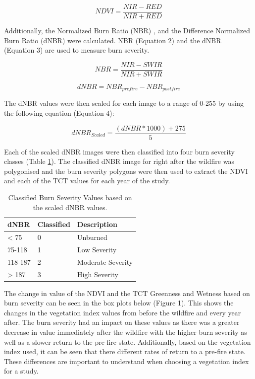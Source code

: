 \documentclass[
]{book}
\begin{document}
\begin{equation}
\tag{1}
  NDVI = \frac{NIR - RED}{NIR + RED}
\end{equation}

Additionally, the Normalized Burn Ratio (NBR) \citep{lopez_garcia_mapping_1991}, and the Difference Normalized Burn Ratio (dNBR) \citep{key_landscape_2006} were calculated. NBR (Equation 2) and the dNBR (Equation 3) are used to measure burn severity.

\begin{equation}
\tag{2}
  NBR = \frac{NIR - SWIR}{NIR + SWIR}
\end{equation}

\begin{equation}
\tag{3}
  dNBR = NBR_{pre fire} - NBR_{post fire}
\end{equation}

The dNBR values were then scaled for each image to a range of 0-255 by using the following equation (Equation 4):

\begin{equation}
\tag{4}
  dNBR_{Scaled} = \frac{(dNBR * 1000) + 275}{5}
\end{equation}

Each of the scaled dNBR images were then classified into four burn severity classes (Table \ref{tab:13-murray-case-study-table-1}). The classified dNBR image for right after the wildfire was polygonised and the burn severity polygons were then used to extract the NDVI and each of the TCT values for each year of the study.

\begin{table}

\caption{\label{tab:13-murray-case-study-table-1}Classified Burn Severity Values based on the scaled dNBR values.}
\centering
\begin{tabular}[t]{l|l|l}
\hline
dNBR & Classified & Description\\
\hline
< 75 & 0 & Unburned\\
\hline
75-118 & 1 & Low Severity\\
\hline
118-187 & 2 & Moderate Severity\\
\hline
> 187 & 3 & High Severity\\
\hline
\end{tabular}
\end{table}

The change in value of the NDVI and the TCT Greenness and Wetness based on burn severity can be seen in the box plots below (Figure 1). This shows the changes in the vegetation index values from before the wildfire and every year after. The burn severity had an impact on these values as there was a greater decrease in value immediately after the wildfire with the higher burn severity as well as a slower return to the pre-fire state. Additionally, based on the vegetation index used, it can be seen that there different rates of return to a pre-fire state. These differences are important to understand when choosing a vegetation index for a study.
\end{document}
